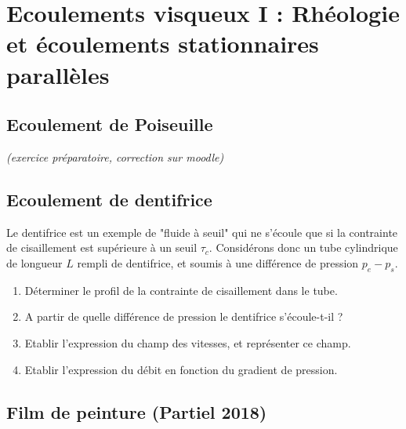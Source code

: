 

\section{Ecoulements visqueux I : Rhéologie et écoulements stationnaires parallèles}


\setcounter{subsection}{-1}

\subsection{Ecoulement de Poiseuille} 

{\em (exercice préparatoire, correction sur moodle)} 


\subsection{Ecoulement de dentifrice}

Le dentifrice est un exemple de "fluide \`a seuil" qui ne s'\'ecoule que si la contrainte 
de cisaillement est sup\'erieure \`a un seuil $\tau_c$. 
Consid\'erons donc un tube cylindrique de longueur $L$ rempli de dentifrice, et soumis \`a 
une diff\'erence de pression $p_e - p_s$. 
\begin{enumerate}
\item 
  D\'eterminer le profil de la contrainte de cisaillement dans le tube. 
\item 
  A partir de quelle diff\'erence de pression le dentifrice s'\'ecoule-t-il ? 
\item 
  Etablir l'expression du champ des vitesses, et repr\'esenter ce champ. 
\item 
  Etablir l'expression du d\'ebit en fonction du gradient de pression. 
\end{enumerate}



\subsection{Film de peinture (Partiel 2018)}

